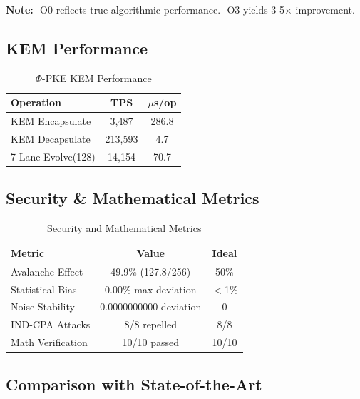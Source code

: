 \documentclass[11pt,a4paper]{article}
\begin{document}
\textbf{Note:} -O0 reflects true algorithmic performance. -O3 yields 3-5$\times$ improvement.

\subsection{KEM Performance}

\begin{table}[h]
\centering
\begin{tabular}{|l|c|c|}
\hline
\textbf{Operation} & \textbf{TPS} & \textbf{$\mu$s/op} \\
\hline
KEM Encapsulate & 3,487 & 286.8 \\
KEM Decapsulate & 213,593 & 4.7 \\
7-Lane Evolve(128) & 14,154 & 70.7 \\
\hline
\end{tabular}
\caption{$\Phi$-PKE KEM Performance}
\end{table}

\subsection{Security \& Mathematical Metrics}

\begin{table}[h]
\centering
\begin{tabular}{|l|c|c|}
\hline
\textbf{Metric} & \textbf{Value} & \textbf{Ideal} \\
\hline
Avalanche Effect & 49.9\% (127.8/256) & 50\% \\
Statistical Bias & 0.00\% max deviation & $<$1\% \\
Noise Stability & 0.0000000000 deviation & 0 \\
IND-CPA Attacks & 8/8 repelled & 8/8 \\
Math Verification & 10/10 passed & 10/10 \\
\hline
\end{tabular}
\caption{Security and Mathematical Metrics}
\end{table}

\subsection{Comparison with State-of-the-Art}
\end{document}

